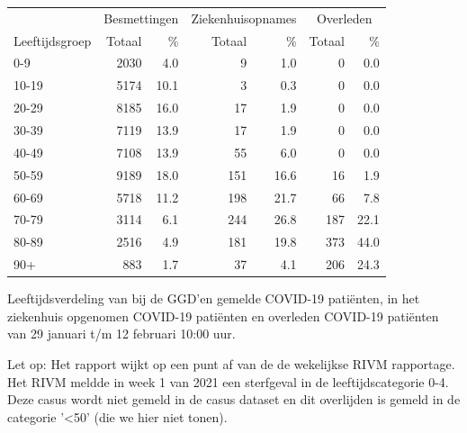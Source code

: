 \documentclass[
  english,
  man,floatsintext]{apa6}
\begin{document}
\begin{table}[H]
\centering\begingroup\fontsize{11}{13}\selectfont

\begin{threeparttable}
\begin{tabular}{lrrrrrr}
\toprule
\multicolumn{1}{c}{ } & \multicolumn{2}{c}{Besmettingen} & \multicolumn{2}{c}{Ziekenhuisopnames} & \multicolumn{2}{c}{Overleden} \\
\cmidrule(l{3pt}r{3pt}){2-3} \cmidrule(l{3pt}r{3pt}){4-5} \cmidrule(l{3pt}r{3pt}){6-7}
Leeftijdsgroep & Totaal & \% & Totaal & \% & Totaal & \%\\
\midrule
0-9 & 2030 & 4.0 & 9 & 1.0 & 0 & 0.0\\
10-19 & 5174 & 10.1 & 3 & 0.3 & 0 & 0.0\\
20-29 & 8185 & 16.0 & 17 & 1.9 & 0 & 0.0\\
30-39 & 7119 & 13.9 & 17 & 1.9 & 0 & 0.0\\
40-49 & 7108 & 13.9 & 55 & 6.0 & 0 & 0.0\\
50-59 & 9189 & 18.0 & 151 & 16.6 & 16 & 1.9\\
60-69 & 5718 & 11.2 & 198 & 21.7 & 66 & 7.8\\
70-79 & 3114 & 6.1 & 244 & 26.8 & 187 & 22.1\\
80-89 & 2516 & 4.9 & 181 & 19.8 & 373 & 44.0\\
90+ & 883 & 1.7 & 37 & 4.1 & 206 & 24.3\\
\bottomrule
\end{tabular}
\begin{tablenotes}
\item[1] Leeftijdsverdeling van bij de GGD’en gemelde COVID-19 patiënten, in het ziekenhuis opgenomen COVID-19 patiënten en overleden COVID-19 patiënten van 29 januari t/m 12 februari 10:00 uur.
\item[2] Let op: Het rapport wijkt op een punt af van de de wekelijkse RIVM rapportage. Het RIVM meldde in week 1 van 2021 een sterfgeval in de leeftijdscategorie 0-4. Deze casus wordt niet gemeld in de casus dataset en dit overlijden is gemeld in de categorie '<50' (die we hier niet tonen).
\end{tablenotes}
\end{threeparttable}
\endgroup{}
\end{table}

\newpage
\end{document}
